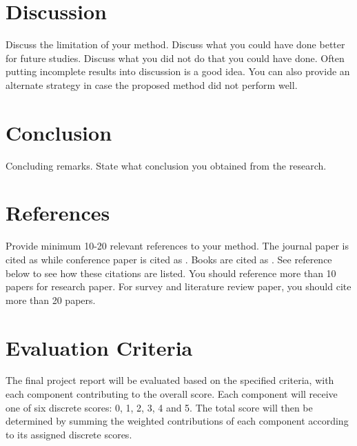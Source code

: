 \documentclass[12pt,portrait]{article}
\begin{document}
\section{Discussion}
Discuss the limitation of your method. Discuss what you could have done better for future studies. Discuss what you did not do that you could have done. Often putting incomplete results into discussion is a good idea. You can also provide   an alternate strategy in case the proposed method did not perform well.


\section{Conclusion}
Concluding remarks. State what conclusion you obtained from the research. 

\section{References}
Provide minimum 10-20 relevant references to your method. The journal paper is cited as \citet{chung.2001.NI} while conference paper is cited as \citet{chung.2003.CVPR}. Books are cited as \citet{chung.2012.CNA}. See reference below to see how these citations are listed. You should reference more than 10 papers for research paper. For survey and literature review paper, you should cite more than 20 papers. 




\newpage 
\section{Evaluation Criteria}

The final project report will be evaluated based on the specified criteria, with each component contributing to the overall score. Each component will receive one of six discrete scores: 0, 1, 2, 3, 4 and 5. The total score will then be determined by summing the weighted contributions of each component according to its assigned discrete scores.
\end{document}
